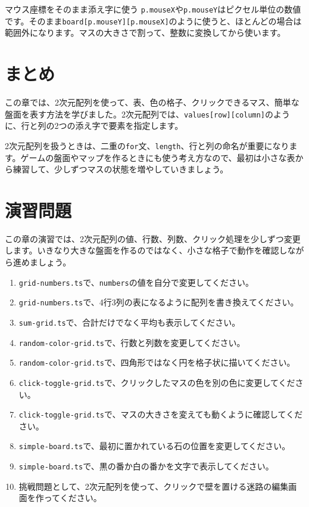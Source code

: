 \begin{mistakebox}{マウス座標をそのまま添え字に使う}
\texttt{p.mouseX}や\texttt{p.mouseY}はピクセル単位の数値です。そのまま\texttt{board[p.mouseY][p.mouseX]}のように使うと、ほとんどの場合は範囲外になります。マスの大きさで割って、整数に変換してから使います。
\end{mistakebox}

\section{まとめ}

この章では、2次元配列を使って、表、色の格子、クリックできるマス、簡単な盤面を表す方法を学びました。2次元配列では、\texttt{values[row][column]}のように、行と列の2つの添え字で要素を指定します。

2次元配列を扱うときは、二重の\texttt{for}文、\texttt{length}、行と列の命名が重要になります。ゲームの盤面やマップを作るときにも使う考え方なので、最初は小さな表から練習して、少しずつマスの状態を増やしていきましょう。

\section{演習問題}

この章の演習では、2次元配列の値、行数、列数、クリック処理を少しずつ変更します。いきなり大きな盤面を作るのではなく、小さな格子で動作を確認しながら進めましょう。

\begin{enumerate}
    \item \texttt{grid-numbers.ts}で、\texttt{numbers}の値を自分で変更してください。
    \item \texttt{grid-numbers.ts}で、4行3列の表になるように配列を書き換えてください。
    \item \texttt{sum-grid.ts}で、合計だけでなく平均も表示してください。
    \item \texttt{random-color-grid.ts}で、行数と列数を変更してください。
    \item \texttt{random-color-grid.ts}で、四角形ではなく円を格子状に描いてください。
    \item \texttt{click-toggle-grid.ts}で、クリックしたマスの色を別の色に変更してください。
    \item \texttt{click-toggle-grid.ts}で、マスの大きさを変えても動くように確認してください。
    \item \texttt{simple-board.ts}で、最初に置かれている石の位置を変更してください。
    \item \texttt{simple-board.ts}で、黒の番か白の番かを文字で表示してください。
    \item 挑戦問題として、2次元配列を使って、クリックで壁を置ける迷路の編集画面を作ってください。
\end{enumerate}
